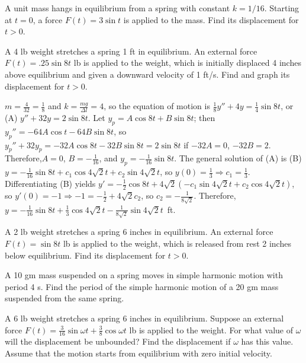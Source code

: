 \documentclass{ximera}
\begin{document}
\begin{problem}\label{exer:6.1.11}
A unit mass hangs in equilibrium from a spring with constant $k=1/16$.
Starting at $t=0$, a force $F(t)=3\sin t$ is applied to the mass. Find
its displacement for $t>0$.
\end{problem}

\begin{problem}\label{exer:6.1.12} 
A 4 lb weight stretches a spring 1 ft in equilibrium. An external
force $F(t)=.25\sin8 t$ lb is applied to the weight, which is
initially displaced 4 inches above equilibrium and given a downward
velocity of 1 ft/s. Find and graph its displacement for $t>0$.

\begin{solution}
$m=\frac{4}{32}=\frac{1}{8}$ and $k=\frac{mg}{\Delta l}=4$, so
the equation of motion is $\frac{1}{8}y''+4y =\frac{1}{4}\sin8t$,
or (A) $y''+32y=2\sin8t$. Let $y_p=A\cos8t+B\sin8t$; then
$y_p''=-64A\cos t-64B\sin8t$, so $y_p''+32y_p=-32A\cos8t-32B\sin8t=
2\sin8t$ if $-32A=0$, $-32B=2$. Therefore,$A=0$, $B=-\frac{1}{16}$,
and $y_p=-\frac{1}{16}\sin8t$. The general solution of (A) is (B)
$y=-\frac{1}{16}\sin8t+c_1\cos4\sqrt2t+c_2\sin4\sqrt2t$, so
$y(0)=\frac{1}{3}\Rightarrow c_1=\frac{1}{3}$. Differentiating (B)
yields $y'=-\frac{1}{2}\cos
8t+4\sqrt2(-c_1\sin4\sqrt2t+c_2\cos4\sqrt2t)$, so $y'(0)=-1\Rightarrow
-1=-\frac{1}{2}+4\sqrt2c_2$, so $c_2=-\frac{1}{8\sqrt2}$.
Therefore,$y=-\frac{1}{16}\sin8t+\frac{1}{3}\cos4\sqrt2t
-\frac{1}{8\sqrt2 }\sin 4\sqrt2t$~ft.
\end{solution}
\end{problem}

\begin{problem}\label{exer:6.1.13}
A 2 lb weight stretches a spring 6 inches in equilibrium.  An external
force $F(t)=\sin8t$ lb is applied to the weight, which is released
from rest 2 inches below equilibrium. Find its displacement
for $t>0$.
\end{problem}

\begin{problem}\label{exer:6.1.14}
A 10 gm mass suspended on a spring moves in simple harmonic
motion with period 4 s.  Find the period of the simple
harmonic motion of a 20 gm mass suspended from the same spring.
\end{problem}

\begin{problem}\label{exer:6.1.15}
A 6 lb weight stretches a spring 6 inches in equilibrium. Suppose
an external force $F(t)=\frac{3}{16}\sin\omega
t+\frac{3}{8}\cos\omega t $ lb is applied to the weight. For what
value
of $\omega$ will the displacement be unbounded? Find the displacement
if $\omega$ has this value. Assume that the motion starts from
equilibrium with zero initial velocity.
\end{problem}
\end{document}
